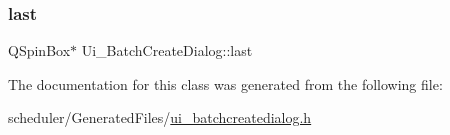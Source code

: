 \mbox{\label{class_ui___batch_create_dialog_a493f34f4ffa8f3e5f2daea2013af5560}} 
\subsubsection{\texorpdfstring{last}{last}}
{\footnotesize\ttfamily Q\+Spin\+Box$\ast$ Ui\+\_\+\+Batch\+Create\+Dialog\+::last}



The documentation for this class was generated from the following file\+:\begin{DoxyCompactItemize}
\item 
scheduler/\+Generated\+Files/\mbox{\hyperlink{ui__batchcreatedialog_8h}{ui\+\_\+batchcreatedialog.\+h}}\end{DoxyCompactItemize}
